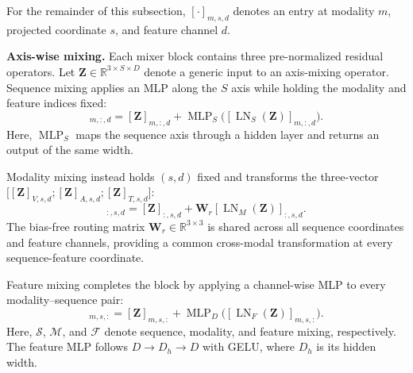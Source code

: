\documentclass[letterpaper]{article} %
\begin{document}
For the remainder of this subsection, $[\cdot]_{m,s,d}$ denotes an entry at modality $m$, projected coordinate $s$, and feature channel $d$.

\noindent\textbf{Axis-wise mixing.}
Each mixer block contains three pre-normalized residual operators. Let $\mathbf{Z}\in\mathbb{R}^{3\times S\times D}$ denote a generic input to an axis-mixing operator. Sequence mixing applies an MLP along the $S$ axis while holding the modality and feature indices fixed:
\begin{equation}
[\mathcal{S}(\mathbf{Z})]_{m,:,d}
=[\mathbf{Z}]_{m,:,d}
+\operatorname{MLP}_{S}
  \bigl([\operatorname{LN}_{S}(\mathbf{Z})]_{m,:,d}\bigr).
\label{eq:sequence_mixing}
\end{equation}
Here, $\operatorname{MLP}_{S}$ maps the sequence axis through a hidden
layer and returns an output of the same width.

Modality mixing instead holds $(s,d)$ fixed and transforms the
three-vector $\bigl[[\mathbf{Z}]_{V,s,d};
[\mathbf{Z}]_{A,s,d};[\mathbf{Z}]_{T,s,d}\bigr]$:
\begin{equation}
[\mathcal{M}(\mathbf{Z})]_{:,s,d}
=[\mathbf{Z}]_{:,s,d}
+\mathbf{W}_{r}
  [\operatorname{LN}_{M}(\mathbf{Z})]_{:,s,d}.
\label{eq:modality_mixing}
\end{equation}
The bias-free routing matrix
$\mathbf{W}_{r}\in\mathbb{R}^{3\times3}$ is shared across all sequence
coordinates and feature channels, providing a common cross-modal
transformation at every sequence-feature coordinate.

Feature mixing completes the block by applying a channel-wise MLP to every
modality--sequence pair:
\begin{equation}
[\mathcal{F}(\mathbf{Z})]_{m,s,:}
=[\mathbf{Z}]_{m,s,:}
+\operatorname{MLP}_{D}
  \bigl([\operatorname{LN}_{F}(\mathbf{Z})]_{m,s,:}\bigr).
\label{eq:feature_mixing}
\end{equation}
Here, $\mathcal{S}$, $\mathcal{M}$, and $\mathcal{F}$ denote sequence,
modality, and feature mixing, respectively.  The feature MLP follows
$D\!\rightarrow\!D_h\!\rightarrow\!D$ with GELU, where $D_h$ is its
hidden width.
\end{document}
